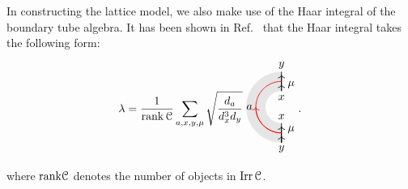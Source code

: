 \documentclass[a4paper,11pt]{article}
\theoremstyle{theorem}
\theoremstyle{remark}
\newcommand\eC           {\EuScript{C}}
\newcommand{\Irr}{\operatorname{Irr}}
\begin{document}
In constructing the lattice model, we also make use of the Haar integral of the boundary tube algebra. It has been shown in Ref.~\cite{jia2025weakhopftubealgebra} that the Haar integral takes the following form:
\begin{equation}\label{eq:HaarTube}
    \lambda = \frac{1}{\operatorname{rank} \eC} \sum_{a,x,y,\mu} 
    \sqrt{\frac{d_a}{d_x^3 d_y}}
        \begin{aligned}
    \begin{tikzpicture}
        \begin{scope}
            \fill[gray!20]
                (0,1.1) arc[start angle=90, end angle=270, radius=1.1] -- 
                (0,-0.5) arc[start angle=270, end angle=90, radius=0.5] -- cycle;
        \end{scope}
           \draw[line width=0.6pt,black,->] (0,0.5)--(0,0.7);
           \draw[line width=0.6pt,black,->] (0,0.7)--(0,1.0);
           \draw[line width=0.6pt,black] (0,0.5)--(0,1.1);
        \draw[line width=.6pt,black] (0,-0.5)--(0,-1.1);
        \draw[line width=0.6pt,black,->] (0,-1.1)--(0,-0.9);
        \draw[line width=0.6pt,black,->] (0,-1.1)--(0,-0.6);
        \draw[red, line width=0.6pt] (0,0.8) arc[start angle=90, end angle=270, radius=0.8];
           \draw[red, line width=0.6pt, ->] (0,-0.8) arc[start angle=270, end angle=180, radius=0.8];
        \node[line width=0.6pt, dashed, draw opacity=0.5] at (0,1.3) {$y$};
        \node[line width=0.6pt, dashed, draw opacity=0.5] at (0,-1.3) {$y$};
        \node[line width=0.6pt, dashed, draw opacity=0.5] at (-1,0) {$a$};
        \node[line width=0.6pt, dashed, draw opacity=0.5] at (0.3,-0.7) {$\mu$};
        \node[line width=0.6pt, dashed, draw opacity=0.5] at (0,-0.3) {$x$};
        \node[line width=0.6pt, dashed, draw opacity=0.5] at (0,0.3) {$x$};
        \node[line width=0.6pt, dashed, draw opacity=0.5] at (0.3,0.7) {$\mu$};
    \end{tikzpicture}
\end{aligned}.
\end{equation}
where $\mathrm{rank} \eC$ denotes the number of objects in $\Irr \eC$.
\end{document}
